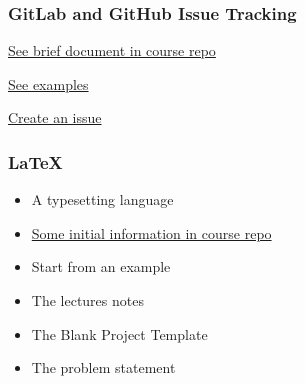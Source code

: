 \documentclass[t,12pt,numbers,fleqn]{beamer}
\begin{document}

\begin{frame}
\frametitle{GitLab and GitHub Issue Tracking}

\bi
\item \href{https://gitlab.cas.mcmaster.ca/smiths/cas741/tree/master/ToolTutorials/gitAndGitLab}{See brief document in course repo}
\item \href{https://github.com/JacquesCarette/literate-scientific-software/issues}{See
  examples}
\item \href{https://gitlab.cas.mcmaster.ca/smiths/cas741/issues}{Create an issue}
\ei

\end{frame}


\begin{frame}
\frametitle{LaTeX}
\begin{itemize}
\item A typesetting language
\item \href{https://gitlab.cas.mcmaster.ca/smiths/cas741/tree/master/ToolTutorials/LaTeX}{Some initial information in course repo}
\item Start from an example
\bi
\item The lectures notes
\item The Blank Project Template
\item The problem statement
\ei
\end{itemize}
\end{frame}

\end{document}
